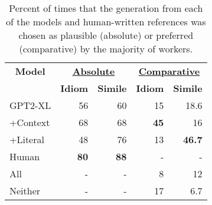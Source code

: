 

\begin{table}[t]
\small
\centering
\begin{tabular}{lrrrr}
\toprule
\multicolumn{1}{c}{\textbf{Model}} & \multicolumn{2}{c}{\textbf{\underline{Absolute}}} & \multicolumn{2}{c}{\textbf{\underline{Comparative}}} \\
& \multicolumn{1}{c}{\textbf{Idiom}} & \multicolumn{1}{c}{\textbf{Simile}} &  \multicolumn{1}{c}{\textbf{Idiom}} & \multicolumn{1}{c}{\textbf{Simile}} \\ \midrule
GPT2-XL & 56 & 60 & 15 & 18.6 \\ 
+Context & 68 & 68 & \textbf{45} & 16 \\ 
+Literal & 48 & 76 & 13 & \textbf{46.7} \\ 
Human & \textbf{80} & \textbf{88} & - & - \\ \midrule
All & - & - & 8 & 12 \\ 
Neither & - & - & 17 & 6.7 \\ \bottomrule
\end{tabular}
\caption{Percent of times that the generation from each of the models and human-written references was chosen as plausible (absolute) or preferred (comparative) by the majority of workers.}
\label{tab:humaneval}
\end{table}